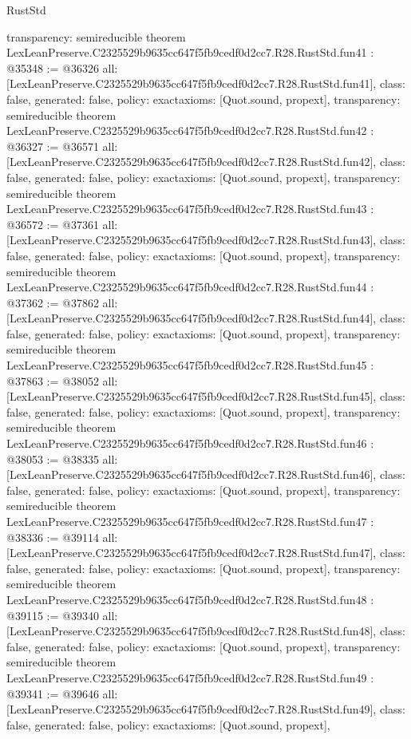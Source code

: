 \begin{lexlean}{RustStd}
\begin{coremodule}
{  transparency: semireducible
}
theorem LexLeanPreserve.C2325529b9635cc647f5fb9cedf0d2cc7.R28.RustStd.fun41 : @35348 := @36326 {
  all: [LexLeanPreserve.C2325529b9635cc647f5fb9cedf0d2cc7.R28.RustStd.fun41],
  class: false,
  generated: false,
  policy: exact{axioms: [Quot.sound, propext]},
  transparency: semireducible
}
theorem LexLeanPreserve.C2325529b9635cc647f5fb9cedf0d2cc7.R28.RustStd.fun42 : @36327 := @36571 {
  all: [LexLeanPreserve.C2325529b9635cc647f5fb9cedf0d2cc7.R28.RustStd.fun42],
  class: false,
  generated: false,
  policy: exact{axioms: [Quot.sound, propext]},
  transparency: semireducible
}
theorem LexLeanPreserve.C2325529b9635cc647f5fb9cedf0d2cc7.R28.RustStd.fun43 : @36572 := @37361 {
  all: [LexLeanPreserve.C2325529b9635cc647f5fb9cedf0d2cc7.R28.RustStd.fun43],
  class: false,
  generated: false,
  policy: exact{axioms: [Quot.sound, propext]},
  transparency: semireducible
}
theorem LexLeanPreserve.C2325529b9635cc647f5fb9cedf0d2cc7.R28.RustStd.fun44 : @37362 := @37862 {
  all: [LexLeanPreserve.C2325529b9635cc647f5fb9cedf0d2cc7.R28.RustStd.fun44],
  class: false,
  generated: false,
  policy: exact{axioms: [Quot.sound, propext]},
  transparency: semireducible
}
theorem LexLeanPreserve.C2325529b9635cc647f5fb9cedf0d2cc7.R28.RustStd.fun45 : @37863 := @38052 {
  all: [LexLeanPreserve.C2325529b9635cc647f5fb9cedf0d2cc7.R28.RustStd.fun45],
  class: false,
  generated: false,
  policy: exact{axioms: [Quot.sound, propext]},
  transparency: semireducible
}
theorem LexLeanPreserve.C2325529b9635cc647f5fb9cedf0d2cc7.R28.RustStd.fun46 : @38053 := @38335 {
  all: [LexLeanPreserve.C2325529b9635cc647f5fb9cedf0d2cc7.R28.RustStd.fun46],
  class: false,
  generated: false,
  policy: exact{axioms: [Quot.sound, propext]},
  transparency: semireducible
}
theorem LexLeanPreserve.C2325529b9635cc647f5fb9cedf0d2cc7.R28.RustStd.fun47 : @38336 := @39114 {
  all: [LexLeanPreserve.C2325529b9635cc647f5fb9cedf0d2cc7.R28.RustStd.fun47],
  class: false,
  generated: false,
  policy: exact{axioms: [Quot.sound, propext]},
  transparency: semireducible
}
theorem LexLeanPreserve.C2325529b9635cc647f5fb9cedf0d2cc7.R28.RustStd.fun48 : @39115 := @39340 {
  all: [LexLeanPreserve.C2325529b9635cc647f5fb9cedf0d2cc7.R28.RustStd.fun48],
  class: false,
  generated: false,
  policy: exact{axioms: [Quot.sound, propext]},
  transparency: semireducible
}
theorem LexLeanPreserve.C2325529b9635cc647f5fb9cedf0d2cc7.R28.RustStd.fun49 : @39341 := @39646 {
  all: [LexLeanPreserve.C2325529b9635cc647f5fb9cedf0d2cc7.R28.RustStd.fun49],
  class: false,
  generated: false,
  policy: exact{axioms: [Quot.sound, propext]},
}
\end{coremodule}
\end{lexlean}
